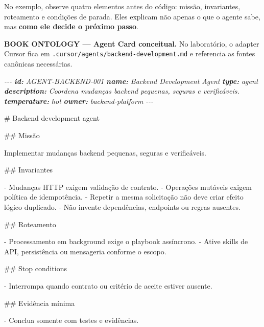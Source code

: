 \documentclass[
  10pt,
  a4paper,
  oneside]{book}
\newenvironment{Shaded}{}{}
\newcommand{\AnnotationTok}[1]{\textcolor[rgb]{0.38,0.63,0.69}{\textbf{\textit{#1}}}}
\newcommand{\CommentTok}[1]{\textcolor[rgb]{0.38,0.63,0.69}{\textit{#1}}}
\newcommand{\FunctionTok}[1]{\textcolor[rgb]{0.02,0.16,0.49}{#1}}
\newcommand{\NormalTok}[1]{#1}
\newcommand{\SpecialStringTok}[1]{\textcolor[rgb]{0.73,0.40,0.53}{#1}}
\begin{document}
No exemplo, observe quatro elementos antes do código: missão,
invariantes, roteamento e condições de parada. Eles explicam não apenas
o que o agente sabe, mas \textbf{como ele decide o próximo passo}.

\textbf{BOOK ONTOLOGY --- Agent Card conceitual.} No laboratório, o
adapter Cursor fica em \texttt{.cursor/agents/backend-development.md} e
referencia as fontes canônicas necessárias.

\begin{Shaded}
\begin{Highlighting}[]
\CommentTok{{-}{-}{-}}
\AnnotationTok{id:}\CommentTok{ AGENT{-}BACKEND{-}001}
\AnnotationTok{name:}\CommentTok{ Backend Development Agent}
\AnnotationTok{type:}\CommentTok{ agent}
\AnnotationTok{description:}\CommentTok{ Coordena mudanças backend pequenas, seguras e verificáveis.}
\AnnotationTok{temperature:}\CommentTok{ hot}
\AnnotationTok{owner:}\CommentTok{ backend{-}platform}
\CommentTok{{-}{-}{-}}

\FunctionTok{\# Backend development agent}

\FunctionTok{\#\# Missão}

\NormalTok{Implementar mudanças backend pequenas, seguras e verificáveis.}

\FunctionTok{\#\# Invariantes}

\SpecialStringTok{{-} }\NormalTok{Mudanças HTTP exigem validação de contrato.}
\SpecialStringTok{{-} }\NormalTok{Operações mutáveis exigem política de idempotência.}
\SpecialStringTok{{-} }\NormalTok{Repetir a mesma solicitação não deve criar efeito lógico duplicado.}
\SpecialStringTok{{-} }\NormalTok{Não invente dependências, endpoints ou regras ausentes.}

\FunctionTok{\#\# Roteamento}

\SpecialStringTok{{-} }\NormalTok{Processamento em background exige o playbook assíncrono.}
\SpecialStringTok{{-} }\NormalTok{Ative skills de API, persistência ou mensageria conforme o escopo.}

\FunctionTok{\#\# Stop conditions}

\SpecialStringTok{{-} }\NormalTok{Interrompa quando contrato ou critério de aceite estiver ausente.}

\FunctionTok{\#\# Evidência mínima}

\SpecialStringTok{{-} }\NormalTok{Conclua somente com testes e evidências.}
\end{Highlighting}
\end{Shaded}
\end{document}
